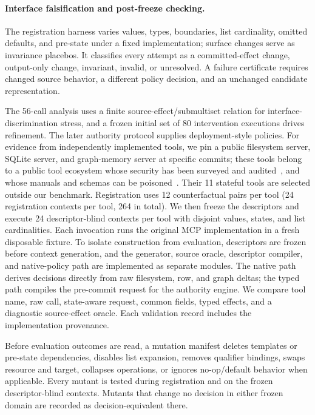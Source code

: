 \paragraph{Interface falsification and post-freeze checking.}
The registration harness varies values, types, boundaries, list cardinality,
omitted defaults, and pre-state under a fixed implementation; surface changes
serve as invariance placebos. It classifies every attempt as a committed-effect
change, output-only change, invariant, invalid, or unresolved. A failure
certificate requires changed source behavior, a different policy decision, and
an unchanged candidate representation.

The 56-call analysis uses a finite source-effect/submultiset relation for
interface-discrimination stress, and a frozen initial set of 80 intervention
executions drives refinement. The later authority protocol supplies deployment-style policies.
For evidence from independently implemented tools, we pin a public filesystem
server, SQLite server, and graph-memory server at specific commits; these tools
belong to a public tool ecosystem whose security has been surveyed and
audited~\cite{hou2025mcplandscape,radosevich2025mcpaudit,gaire2025sokmcp}, and
whose manuals and schemas can be poisoned~\cite{liu2026manualiles}.
Their 11 stateful tools are selected outside our benchmark. Registration uses
12 counterfactual pairs per tool (24 registration contexts per tool, 264 in
total). We then freeze the descriptors and execute
24 descriptor-blind contexts per tool with disjoint values, states, and list
cardinalities. Each invocation runs the original MCP implementation in a fresh
disposable fixture. To isolate construction from evaluation, descriptors are
frozen before context generation, and the generator, source oracle, descriptor
compiler, and native-policy path are implemented as separate modules. The
native path derives decisions directly from raw filesystem, row, and graph
deltas; the typed path compiles the pre-commit request for the authority engine.
We compare tool name, raw call, state-aware request, common fields, typed
effects, and a diagnostic source-effect oracle. Each validation record includes
the implementation provenance.

Before evaluation outcomes are read, a mutation manifest deletes templates or
pre-state dependencies, disables list expansion, removes qualifier bindings,
swaps resource and target, collapses operations, or ignores no-op/default
behavior when applicable. Every mutant is tested during registration and on
the frozen descriptor-blind contexts. Mutants that change no decision in either
frozen domain are recorded as decision-equivalent there.


